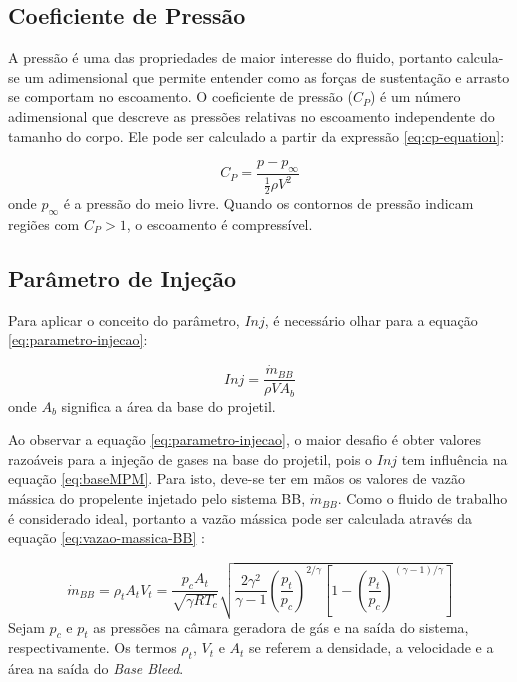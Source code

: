 \subsection{Coeficiente de Pressão}

A pressão é uma das propriedades de maior interesse do fluido, portanto calcula-se um adimensional que permite entender como as forças de sustentação e arrasto se comportam no escoamento. O coeficiente de pressão ($C_{P}$) é um número adimensional que descreve as pressões relativas no escoamento independente do tamanho do corpo. Ele pode ser calculado a partir da expressão \eqref{eq:cp-equation}: 

\begin{equation}\label{eq:cp-equation}
    C_P = \frac{p - p_{\infty}}{\frac{1}{2}\rho V^2}
\end{equation}
%
onde $p_{\infty}$ é a pressão do meio livre. Quando os contornos de pressão indicam regiões com $C_{P} > 1$, o escoamento é compressível.

\subsection{Parâmetro de Injeção}

Para aplicar o conceito do parâmetro, $Inj$, é necessário olhar para a equação \ref{eq:parametro-injecao}:

\begin{equation}\label{eq:parametro-injecao}
    Inj = \frac{\Dot{m}_{BB}}{\rho VA_{b}}
\end{equation}
%
onde $A_{b}$ significa a área da base do projetil. 

Ao observar a equação \ref{eq:parametro-injecao}, o maior desafio é obter valores razoáveis para a injeção de gases na base do projetil, pois o $Inj$ tem influência na equação \ref{eq:baseMPM}. Para isto, deve-se ter em mãos os valores de vazão mássica do propelente injetado pelo sistema BB, $\Dot{m}_{BB}$. Como o fluido de trabalho é considerado ideal, portanto a vazão mássica pode ser calculada através da equação \ref{eq:vazao-massica-BB} \cite{Gil2020}:

\begin{equation}\label{eq:vazao-massica-BB}
    \Dot{m}_{BB} = \rho_{t}A_{t}V_{t} = \frac{p_{c}A_{t}}{\sqrt{\gamma RT_{c}}}\sqrt{\frac{2\gamma^{2}}{\gamma - 1}\left(\frac{p_{t}}{p_{c}}\right)^{2/\gamma}\left[1-\left(\frac{p_{t}}{p_{c}}\right)^{(\gamma-1)/\gamma}\right]}
\end{equation}
%
Sejam $p_{c}$ e $p_{t}$ as pressões na câmara geradora de gás e na saída do sistema, respectivamente. Os termos $\rho_{t}$, $V_{t}$ e $A_{t}$ se referem a densidade, a velocidade e a área na saída do \textit{Base Bleed}. 

